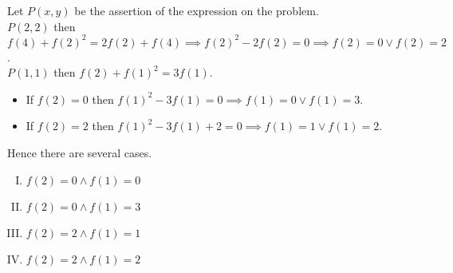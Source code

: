 
\begin{solusi}
    Let $P(x,y)$ be the assertion of the expression on the problem.\\
    $P(2,2)$ then $f(4)+f(2)^2 = 2f(2)+f(4) \implies f(2)^2-2f(2)=0 \implies f(2)=0 \vee f(2)=2$.\\
    $P(1,1)$ then $f(2)+f(1)^2 = 3f(1)$.
    \begin{itemize}
        \item If $f(2)=0$ then $f(1)^2-3f(1)=0 \implies f(1)=0 \vee f(1)=3$.
        \item If $f(2)=2$ then $f(1)^2-3f(1)+2=0 \implies f(1)=1 \vee f(1)=2$.
    \end{itemize}
    Hence there are several cases.
    \begin{enumerate}[I.]
        \item $f(2)=0 \wedge f(1)=0$\\
        
        \item $f(2)=0 \wedge f(1)=3$\\
        \item $f(2)=2 \wedge f(1)=1$\\
        \item $f(2)=2 \wedge f(1)=2$\\
    \end{enumerate}
\end{solusi}